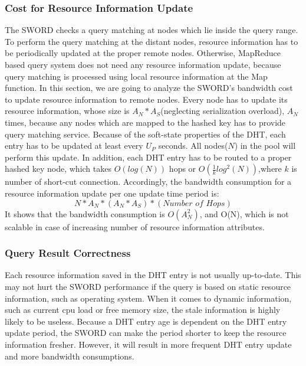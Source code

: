 \documentclass{acm_proc_article-sp}
\begin{document}
\subsubsection{Cost for Resource Information Update}
The SWORD checks a query matching at nodes which lie inside the query range. To perform the query matching at the distant nodes, resource information has to be periodically updated at the proper remote nodes.
Otherwise, MapReduce based query system does not need any resource information update, because query matching is processed using local resource information at the Map function.
In this section, we are going to analyze the SWORD's bandwidth cost to update resource information to remote nodes.
Every node has to update its resource information, whose size is $A_N*A_S$(neglecting serialization overload), $A_N$ times, because any nodes which are mapped to the hashed key has to provide query matching service. 
Because of the soft-state properties of the DHT, each entry has to be updated at least every $U_P$ seconds. All nodes($N$) in the pool will perform this update.
In addition, each DHT entry has to be routed to a proper hashed key node, which takes $O(log(N))$ hops\cite{chord}\cite{pastry} or \begin{math}O(\frac{1}{k}log^2(N))\end{math},where $k$ is number of short-cut connection\cite{brunet}.
Accordingly, the bandwidth consumption for a resource information update per one update time period is:
\begin{displaymath}N*A_N*(A_N*A_S)*(\textit{Number of Hops})\end{displaymath}
It shows that the bandwidth consumption is $O(A_N^2)$, and O(N), which is not scalable in case of increasing number of resource information attributes.
\subsubsection{Query Result Correctness}
Each resource information saved in the DHT entry is not usually up-to-date. This may not hurt the SWORD performance if the query is based on static resource information, such as operating system. 
When it comes to dynamic information, such as current cpu load or free memory size, the stale information is highly likely to be useless. 
Because a DHT entry age is dependent on the DHT entry update period, the SWORD can make the period shorter to keep the resource information fresher.
However, it will result in more frequent DHT entry update and more bandwidth consumptions.
\end{document}
